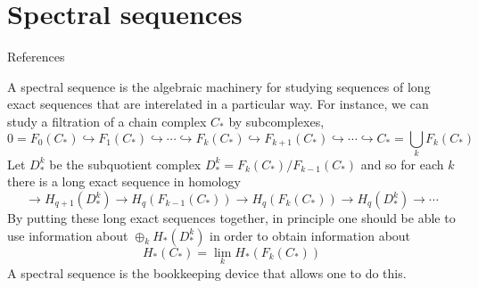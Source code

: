 \section{Spectral sequences}

References \cite{weibelIntroductionHomologicalAlgebra1994,cohen}


A spectral sequence is the algebraic machinery for studying sequences of long exact sequences that are interelated in a particular way. For instance, we can study a filtration of a chain complex $C_*$ by subcomplexes,
$$
0=F_0\left(C_*\right) \hookrightarrow F_1\left(C_*\right) \hookrightarrow \cdots \hookrightarrow F_k\left(C_*\right) \hookrightarrow F_{k+1}\left(C_*\right) \hookrightarrow \cdots \hookrightarrow C_*=\bigcup_k F_k\left(C_*\right)
$$
Let $D_*^k$ be the subquotient complex $D_*^k=F_k\left(C_*\right) / F_{k-1}\left(C_*\right)$ and so for each $k$ there is a long exact sequence in homology
$$
\longrightarrow H_{q+1}\left(D_*^k\right) \longrightarrow H_q\left(F_{k-1}\left(C_*\right)\right) \longrightarrow H_q\left(F_k\left(C_*\right)\right) \longrightarrow H_q\left(D_*^k\right) \longrightarrow \cdots
$$
By putting these long exact sequences together, in principle one should be able to use information about $\oplus_k H_*\left(D_*^k\right)$ in order to obtain information about
$$
H_*\left(C_*\right)=\underset{k}{\lim } H_*\left(F_k\left(C_*\right)\right)
$$
A spectral sequence is the bookkeeping device that allows one to do this.










